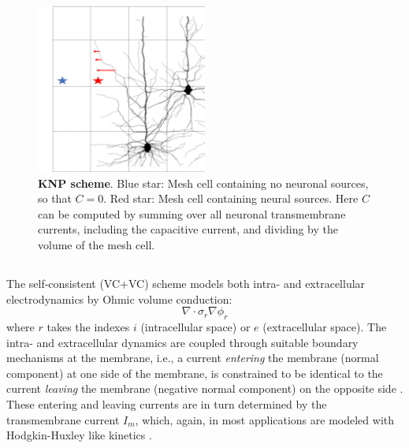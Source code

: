 \begin{figure}[!ht]
\begin{center}
\includegraphics[width=0.5\textwidth]{Figures/Eldiff/KNP.png}
\end{center}
\caption{\textbf{KNP scheme}. Blue star: Mesh cell containing no neuronal sources, so that $C=0$. Red star: Mesh cell containing neural sources. Here $C$ can be computed by summing over all neuronal transmembrane currents, including the capacitive current, and dividing by the volume of the mesh cell. }
\label{Eldiff:fig:KNPmesh}
\end{figure}





\subsection{}
The self-consistent (VC+VC) scheme models both intra- and extracellular electrodynamics by Ohmic volume conduction:
\begin{equation}
\nabla \cdot \sigma_r \nabla \phi_r
\end{equation}
where $r$ takes the indexes $i$ (intracellular space) or $e$ (extracellular space). The intra- and extracellular dynamics are coupled through suitable boundary mechanisms at the membrane, i.e., a current \textit{entering} the membrane (normal component) at one side of the membrane, is constrained to be identical to the current \textit{leaving} the membrane (negative normal component) on the opposite side  \citep{Krassowska1994}. These entering and leaving currents are in turn determined by the transmembrane current $I_m$, which, again, in most applications are modeled with Hodgkin-Huxley like kinetics \citep{Agudelo-Toro2013, Tveito2017}. 

